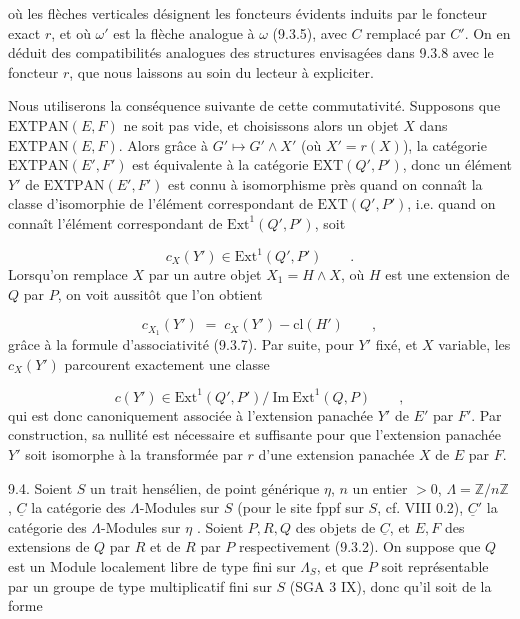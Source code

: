 
où les flèches verticales désignent les foncteurs évidents induits par le foncteur exact $r$, et où $\omega'$ est la flèche analogue à $\omega$ (9.3.5), avec $C$ remplacé par $C'$. On en déduit des compatibilités analogues des structures envisagées dans 9.3.8 avec le foncteur $r$, que nous laissons au soin du lecteur à expliciter.

Nous utiliserons la conséquence suivante de cette commutativité. Supposons que $\mathrm{EXTPAN}(E,F)$ ne soit pas vide, et choisissons alors un objet $X$ dans $\mathrm{EXTPAN}(E,F)$. Alors grâce à $G' \longmapsto G' \wedge X'$ (où $X'=r(X)$), la catégorie $\mathrm{EXTPAN}(E',F')$ est équivalente à la catégorie $\mathrm{EXT}(Q',P')$, donc un élément $Y'$ de $\mathrm{EXTPAN}(E',F')$ est connu à isomorphisme près quand on connaît la classe d'isomorphie de l'élément correspondant de $\mathrm{EXT}(Q',P')$, i.e. quand on connaît l'élément correspondant de $\mathrm{Ext}^1(Q' ,P')$, soit

\begin{equation*}
c_X(Y') \in \mathrm{Ext}^1(Q',P') \qquad .
\end{equation*}
Lorsqu'on remplace $X$ par un autre objet $X_1 = H \wedge X$, où $H$ est une extension de $Q$ par $P$, on voit aussitôt que l'on obtient

\begin{equation*}
c_{X_1}(Y') \;=\; c_X(Y') - \mathrm{cl}(H') \qquad ,
\end{equation*}
grâce à la formule d'associativité (9.3.7). Par suite, pour $Y'$ fixé, et $X$ variable, les $c_X(Y')$ parcourent exactement une classe

\begin{equation}\tag{9.3.13}
c(Y') \in \mathrm{Ext}^1(Q',P')/\ \mathrm{Im}\ \mathrm{Ext}^1(Q,P) \qquad ,
\end{equation}
qui est donc canoniquement associée à l'extension panachée $Y'$ de $E'$ par $F'$. Par construction, sa nullité est nécessaire et suffisante pour que l'extension panachée $Y'$ soit isomorphe à la transformée par $r$ d'une extension panachée $X$ de $E$ par $F$.



9.4. Soient $S$ un trait hensélien, de point générique $\eta$, $n$ un entier $> 0$, $\Lambda = \mathbb{Z}/n\mathbb{Z}$ , $\underline{C}$ la catégorie des $\Lambda$-Modules sur $S$ (pour le site fppf sur $S$, cf. VIII 0.2), $\underline{C}'$ la catégorie des $\Lambda$-Modules sur $\eta$ . Soient $P,R,Q$ des objets de $\underline{C}$, et $E,F$ des extensions de $Q$ par $R$ et de $R$ par $P$ respectivement (9.3.2). On suppose que $Q$ est un Module localement libre de type fini sur $\Lambda_S$, et que $P$ soit représentable par un groupe de type multiplicatif fini sur $S$ (SGA 3 IX), donc qu'il soit de la forme


